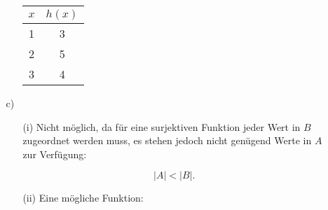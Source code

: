 \documentclass[a4paper]{scrartcl}
\begin{document}
\begin{enumerate}
\begin{enumerate}
\begin{enumerate}
{\begin{minipage}[c]{0.5\textwidth}
                            \end{minipage}
                            \begin{minipage}[c]{0.2\textwidth}
                                \begin{tabular}[t]{c|c}
                                    $x$ & $h(x)$\\
                                    \hline
                                    1 & 3\\
                                    2 & 5\\
                                    3 & 4
                                \end{tabular}
                            \end{minipage}
                        }
                        
                \end{enumerate}
        \item[c)]
            \begin{enumerate}
                    \item[(i)]
                        Nicht möglich, da für eine surjektiven Funktion jeder Wert in $B$ zugeordnet werden muss, es stehen jedoch 
                        nicht genügend Werte in $A$ zur Verfügung:
                        
                        $$\left|A\right| < \left|B\right|.$$
                    \item[(ii)]
                        Eine mögliche Funktion:
                        
\end{enumerate}
\end{enumerate}
\end{enumerate}
\end{document}
